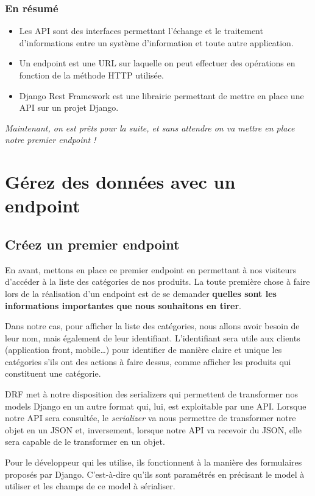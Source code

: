 \documentclass[a4paper]{article}
\begin{document}
\subsubsection*{En résumé}
\begin{itemize}
\item Les API sont des interfaces permettant l’échange et le traitement d’informations entre un système d’information et toute autre application.
\item Un endpoint est une URL sur laquelle on peut effectuer des opérations en fonction de la méthode HTTP utilisée.
\item Django Rest Framework est une librairie permettant de mettre en place une API sur un projet Django.
\end{itemize}

{\em Maintenant, on est prêts pour la suite, et sans attendre on va mettre en place notre premier endpoint !}

\section{Gérez des données avec un endpoint}
\subsection{Créez un premier endpoint}
En avant, mettons en place ce premier {\color{monOrange}endpoint} en permettant à nos visiteurs d’accéder à la liste des catégories de nos produits. La toute première chose à faire lors de la réalisation d’un endpoint est de se demander {\bf quelles sont les informations importantes que nous souhaitons en tirer}.

Dans notre cas, pour afficher la liste des catégories, nous allons avoir besoin de leur nom, mais également de leur {\color{monOrange}identifiant}. L’identifiant sera utile aux clients (application front, mobile…) pour identifier de manière claire et unique les catégories s’ils ont des actions à faire dessus, comme afficher les produits qui constituent une catégorie.

DRF met à notre disposition des {\color{monOrange}serializers} qui permettent de transformer nos models Django en un autre format qui, lui, est exploitable par une API. Lorsque notre API sera consultée, le {\em serializer} va nous permettre de transformer notre objet en un JSON et, inversement, lorsque notre API va recevoir du JSON, elle sera capable de le transformer en un objet.

Pour le développeur qui les utilise, ils fonctionnent à la manière des formulaires proposés par Django. C'est-à-dire qu’ils sont paramétrés en précisant le model à utiliser et les champs de ce model à sérialiser.
\end{document}
